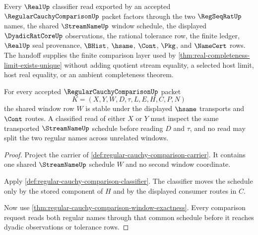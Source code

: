 \begin{theorem}
\label{thm:regular-cauchy-comparison-real-classifier-handoff}
Every $\RealUp$ classifier read exported by an accepted $\RegularCauchyComparisonUp$ packet factors through the two $\RegSeqRatUp$ names, the shared $\StreamNameUp$ window schedule, the displayed $\DyadicRatCoreUp$ observations, the rational tolerance row, the finite ledger, $\RealUp$ seal provenance, $\BHist$, $\hsame$, $\Cont$, $\Pkg$, and $\NameCert$ rows. The handoff supplies the finite comparison layer used by \autoref{thm:real-completeness-limit-exists-unique} without adding quotient stream equality, a selected host limit, host real equality, or an ambient completeness theorem.
\end{theorem}

\begin{theorem}
\label{thm:regular-cauchy-comparison-common-window-stability}
For every accepted $\RegularCauchyComparisonUp$ packet
$$
K=(X,Y,W,D,\tau,L,E,H,C,P,N)
$$
the shared window row $W$ is stable under the displayed $\hsame$ transports and
$\Cont$ routes. A classified read of either $X$ or $Y$ must inspect the same
transported $\StreamNameUp$ schedule before reading $D$ and $\tau$, and no read
may split the two regular names across unrelated windows.
\end{theorem}
\begin{proof}
Project the carrier of
\autoref{def:regular-cauchy-comparison-carrier}. It contains one shared
$\StreamNameUp$ schedule $W$ and no second window coordinate.

Apply \autoref{def:regular-cauchy-comparison-classifier}. The classifier moves
the schedule only by the stored component of $H$ and by the displayed consumer
routes in $C$.

Now use \autoref{thm:regular-cauchy-comparison-window-exactness}. Every
comparison request reads both regular names through that common schedule before
it reaches dyadic observations or tolerance rows.
\end{proof}

